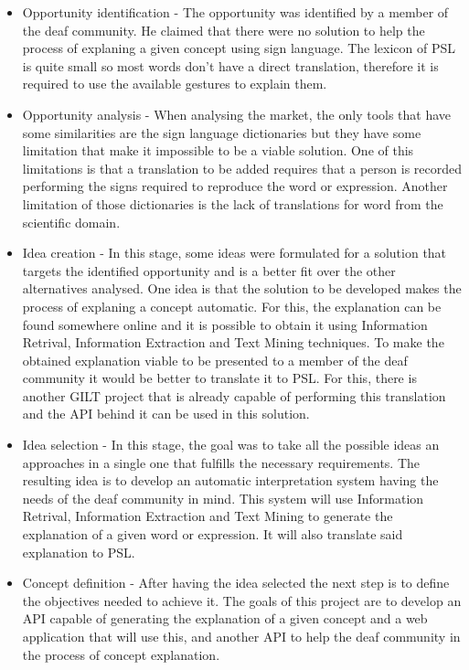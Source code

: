 \begin{itemize}
    \item Opportunity identification - The opportunity was identified by a member of the deaf community.
    He claimed that there were no solution to help the process of explaning a given concept using sign language.
    The lexicon of \gls{PSL} is quite small so most words don't have a direct translation, therefore it is required to use the available gestures to explain them.

    \item Opportunity analysis - When analysing the market, the only tools that have some similarities are the sign language dictionaries but they have some limitation that make it impossible to be a viable solution.
    One of this limitations is that a translation to be added requires that a person is recorded performing the signs required to reproduce the word or expression.
    Another limitation of those dictionaries is the lack of translations for word from the scientific domain.

    \item Idea creation - In this stage, some ideas were formulated for a solution that targets the identified opportunity and is a better fit over the other alternatives analysed.
    One idea is that the solution to be developed makes the process of explaning a concept automatic.
    For this, the explanation can be found somewhere online and it is possible to obtain it using Information Retrival, Information Extraction and Text Mining techniques.
    To make the obtained explanation viable to be presented to a member of the deaf community it would be better to translate it to \gls{PSL}.
    For this, there is another GILT project that is already capable of performing this translation and the \gls{API} behind it can be used in this solution.

    \item Idea selection - In this stage, the goal was to take all the possible ideas an approaches in a single one that fulfills the necessary requirements.
    The resulting idea is to develop an automatic interpretation system having the needs of the deaf community in mind.
    This system will use Information Retrival, Information Extraction and Text Mining to generate the explanation of a given word or expression.
    It will also translate said explanation to \gls{PSL}.

    \item Concept definition - After having the idea selected the next step is to define the objectives needed to achieve it.
    The goals of this project are to develop an \gls{API} capable of generating the explanation of a given concept and a web application that will use this, and another \gls{API} to help the deaf community in the process of concept explanation. 

\end{itemize}

